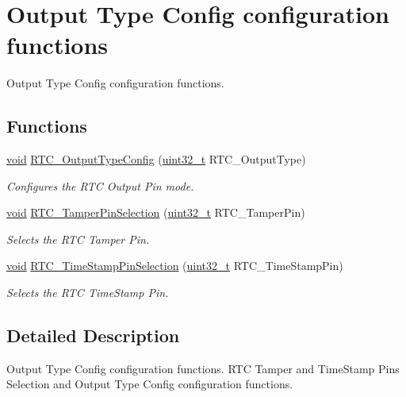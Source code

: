\hypertarget{group___r_t_c___group11}{\section{Output Type Config configuration functions}
\label{group___r_t_c___group11}
}


Output Type Config configuration functions.  


\subsection*{Functions}
\begin{DoxyCompactItemize}
\item 
\hyperlink{group___n_a_m_e_ga18028b8badbf1ea7e704ccac3c488e82}{void} \hyperlink{group___r_t_c___group11_ga95263b7acf7168d52f66ef9121f14760}{R\-T\-C\-\_\-\-Output\-Type\-Config} (\hyperlink{stdint_8h_a435d1572bf3f880d55459d9805097f62}{uint32\-\_\-t} R\-T\-C\-\_\-\-Output\-Type)
\begin{DoxyCompactList}\small\item\em Configures the R\-T\-C Output Pin mode. \end{DoxyCompactList}\item 
\hyperlink{group___n_a_m_e_ga18028b8badbf1ea7e704ccac3c488e82}{void} \hyperlink{group___r_t_c___group11_ga46777272ae77eb9dc38610481e12b0ed}{R\-T\-C\-\_\-\-Tamper\-Pin\-Selection} (\hyperlink{stdint_8h_a435d1572bf3f880d55459d9805097f62}{uint32\-\_\-t} R\-T\-C\-\_\-\-Tamper\-Pin)
\begin{DoxyCompactList}\small\item\em Selects the R\-T\-C Tamper Pin. \end{DoxyCompactList}\item 
\hyperlink{group___n_a_m_e_ga18028b8badbf1ea7e704ccac3c488e82}{void} \hyperlink{group___r_t_c___group11_gaedf9830bdaaaa50ea5d45d2ff7bb43a9}{R\-T\-C\-\_\-\-Time\-Stamp\-Pin\-Selection} (\hyperlink{stdint_8h_a435d1572bf3f880d55459d9805097f62}{uint32\-\_\-t} R\-T\-C\-\_\-\-Time\-Stamp\-Pin)
\begin{DoxyCompactList}\small\item\em Selects the R\-T\-C Time\-Stamp Pin. \end{DoxyCompactList}\end{DoxyCompactItemize}


\subsection{Detailed Description}
Output Type Config configuration functions. R\-T\-C Tamper and Time\-Stamp Pins Selection and Output Type Config configuration functions.

